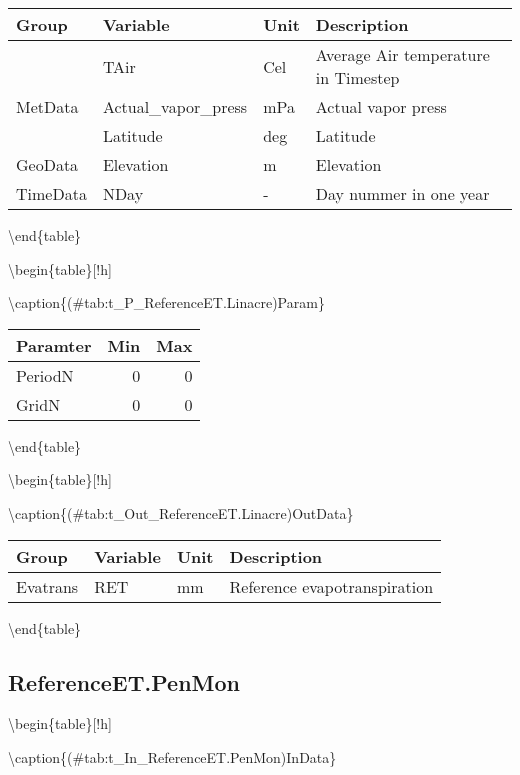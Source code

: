 \documentclass[
]{book}
\begin{document}
\begin{tabular}[t]{l|l|l|l}
\hline
Group & Variable & Unit & Description\\
\hline
 & TAir & Cel & Average Air temperature in Timestep\\
\cline{2-4}
\multirow{-2}{*}{\raggedright\arraybackslash MetData} & Actual\_vapor\_press & mPa & Actual vapor press\\
\cline{1-4}
 & Latitude & deg & Latitude\\
\cline{2-4}
\multirow{-2}{*}{\raggedright\arraybackslash GeoData} & Elevation & m & Elevation\\
\cline{1-4}
TimeData & NDay & - & Day nummer in one year\\
\hline
\end{tabular}

\textbackslash end\{table\}

\textbackslash begin\{table\}{[}!h{]}

\textbackslash caption\{(\#tab:t\_P\_ReferenceET.Linacre)Param\}
\centering

\begin{tabular}[t]{l|r|r}
\hline
Paramter & Min & Max\\
\hline
PeriodN & 0 & 0\\
\cline{1-3}
GridN & 0 & 0\\
\hline
\end{tabular}

\textbackslash end\{table\}

\textbackslash begin\{table\}{[}!h{]}

\textbackslash caption\{(\#tab:t\_Out\_ReferenceET.Linacre)OutData\}
\centering

\begin{tabular}[t]{l|l|l|l}
\hline
Group & Variable & Unit & Description\\
\hline
Evatrans & RET & mm & Reference evapotranspiration\\
\hline
\end{tabular}

\textbackslash end\{table\}

\hypertarget{referenceet.penmon}{%
\subsection{ReferenceET.PenMon}\label{referenceet.penmon}}

\textbackslash begin\{table\}{[}!h{]}

\textbackslash caption\{(\#tab:t\_In\_ReferenceET.PenMon)InData\}
\centering
\end{document}
